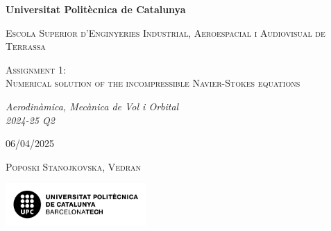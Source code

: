 \begin{titlepage}


\centering
{\bfseries\LARGE Universitat Politècnica de Catalunya\par}
{\scshape\Large Escola Superior d'Enginyeries Industrial, Aeroespacial i Audiovisual de Terrassa\par}
\vspace{2.5cm}
{\scshape\Huge Assignment 1:  \\Numerical solution of the incompressible Navier-Stokes equations
 \par}
\vspace{2cm}
{\itshape\Large Aerodinàmica, Mecànica de Vol i Orbital \\ 2024-25 Q2 \par}
\vspace{0.5cm}
{06/04/2025 \par}
\vspace{0.5cm}
{\scshape\Large Poposki Stanojkovska, Vedran  \par}
\vspace{4.5cm}
\includegraphics[width=0.4\textwidth]{imatges/logo upc negre sobre blanc.png}


\end{titlepage}
\newpage